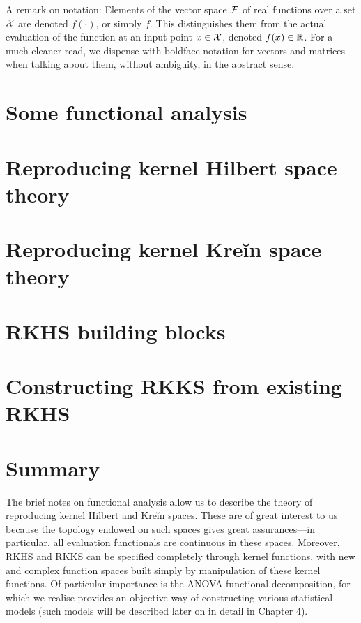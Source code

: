 \documentclass[a4paper,showframe,11pt]{report}
\begin{document}
A remark on notation: Elements of the vector space ${\mathcal F}$ of real functions over a set ${\mathcal X}$ are denoted $f(\cdot)$, or simply $f$.
This distinguishes them from the actual evaluation of the function at an input point $x \in {\mathcal X}$, denoted $f(x) \in \mathbb{R}$.
For a much cleaner read, we dispense with boldface notation for vectors and matrices when talking about them, without ambiguity, in the abstract sense. 

\section{Some functional analysis}


\section{Reproducing kernel Hilbert space theory}\label{sec:rkhstheory}


\section{Reproducing kernel Kreĭn space theory}


\section{RKHS building blocks}


\section{Constructing RKKS from existing RKHS}\label{sec:constructrkks}


\section{Summary}

The brief notes on functional analysis allow us to describe the theory of reproducing kernel Hilbert and Kreĭn spaces.
These are of great interest to us because the topology endowed on such spaces gives great assurances---in particular, all evaluation functionals are continuous in these spaces.
Moreover, RKHS and RKKS can be specified completely through kernel functions, with new and complex function spaces built simply by manipulation of these kernel functions.
Of particular importance is the ANOVA functional decomposition, for which we realise provides an objective way of constructing various statistical models (such models will be described later on in detail in Chapter 4).
\end{document}
